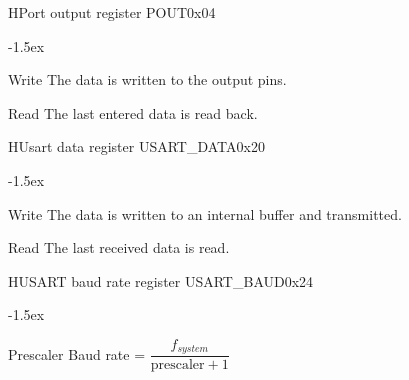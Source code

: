 \documentclass[12pt]{article}
\begin{document}
\begin{register}{H}{Port output register POUT}{0x04}%
\label{poutx}%
\regnewline%
\end{register}
\begin{regdesc}[0.6\textwidth]\begin{reglist}[000000000]
\itemsep-1.5ex
\item[Write] The data is written to the output pins.
\item[Read] The last entered data is read back.
\end{reglist}\end{regdesc}

\begin{register}{H}{Usart data register USART\_DATA}{0x20}
\label{usartdata}
%
%
\regnewline%
\end{register}
\begin{regdesc}[0.6\textwidth]\begin{reglist}[000000000]
\itemsep-1.5ex
\item[Write] The data is written to an internal buffer and transmitted.
\item[Read] The last received data is read.
\end{reglist}\end{regdesc}

\begin{register}{H}{USART baud rate register USART\_BAUD}{0x24}
\label{usartbaud}
%
%
\regnewline%
\end{register}
\begin{regdesc}[0.6\textwidth]\begin{reglist}[000000000]
\itemsep-1.5ex
\item[Prescaler] Baud rate = $\dfrac{f_{system}}{\textrm{prescaler}+1}$
\end{reglist}\end{regdesc}
\end{document}

